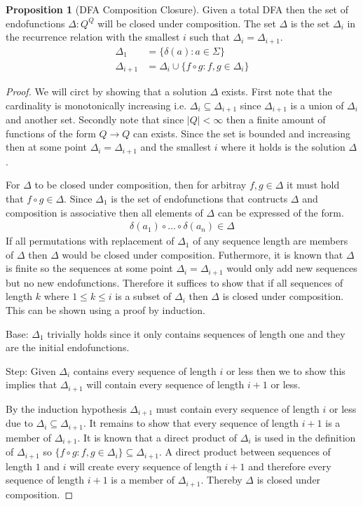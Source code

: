 \documentclass[a4paper,12pt]{article}
\theoremstyle{definition}
\newtheorem{proposition}{Proposition}[section]
\begin{document}
\begin{proposition}[DFA Composition Closure]\label{prop:closure}
  Given a total DFA then the set of endofunctions $\Delta: Q^Q$ will be closed under composition. The set $\Delta$ is the set $\Delta_i$ in the recurrence relation with the smallest $i$ such that $\Delta_i = \Delta_{i + 1}$.
  \begin{align*}
    \Delta_1 &= \{\delta(a) : a \in \Sigma \} \\
    \Delta_{i + 1} &= \Delta_i \cup \{f \circ g : f, g \in \Delta_i\}
  \end{align*}
\end{proposition}
\begin{proof}
  We will circt by showing that a solution $\Delta$ exists. First note that the cardinality is monotonically increasing i.e. $\Delta_i \subseteq \Delta_{i + 1}$ since $\Delta_{i + 1}$ is a union of $\Delta_i$ and another set. Secondly note that since $|Q| < \infty$ then a finite amount of functions of the form $Q \to Q$ can exists. Since the set is bounded and increasing then at some point $\Delta_i = \Delta_{i + 1}$ and the smallest $i$ where it holds is the solution $\Delta$.

  For $\Delta$ to be closed under composition, then for arbitray $f, g \in \Delta$ it must hold that $f \circ g \in \Delta$. Since $\Delta_1$ is the set of endofunctions that contructs $\Delta$ and composition is associative then all elements of $\Delta$ can be expressed of the form.
  \begin{align*}
    \delta(a_1) \circ \dots \circ \delta(a_n) \in \Delta
  \end{align*}
  If all permutations with replacement of $\Delta_1$ of any sequence length are members of $\Delta$ then $\Delta$ would be closed under composition. Futhermore, it is known that $\Delta$ is finite so the sequences at some point $\Delta_i = \Delta_{i + 1}$ would only add new sequences but no new endofunctions. Therefore it suffices to show that if all sequences of length $k$ where $1 \leq k \leq i$ is a subset of $\Delta_i$ then $\Delta$ is closed under composition. This can be shown using a proof by induction.

  Base: $\Delta_1$ trivially holds since it only contains sequences of length one and they are the initial endofunctions.

  Step: Given $\Delta_i$ contains every sequence of length $i$ or less then we to show this implies that $\Delta_{i + 1}$ will contain every sequence of length $i + 1$ or less.

  By the induction hypothesis $\Delta_{i + 1}$ must contain every sequence of length $i$ or less due to $\Delta_i \subseteq \Delta_{i + 1}$. It remains to show that every sequence of length $i + 1$ is a member of $\Delta_{i + 1}$. It is known that a direct product of $\Delta_i$ is used in the definition of $\Delta_{i + 1}$ so $\{f \circ g : f, g \in \Delta_i\} \subseteq \Delta_{i + 1}$. A direct product between sequences of length $1$ and $i$ will create every sequence of length $i + 1$ and therefore every sequence of length $i + 1$ is a member of $\Delta_{i + 1}$. Thereby $\Delta$ is closed under composition.
\end{proof}
\end{document}
